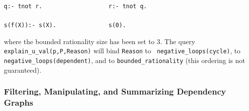 \begin{description}
\begin{example}
\begin{verbatim}
q:- tnot r.                   r:- tnot q.

s(f(X)):- s(X).               s(0).
\end{verbatim}
%
where the bounded rationality size has been set to 3.  The query {\tt
  explain\_u\_val(p,P,Reason)} will bind {\tt Reason} to {\tt
  negative\_loops(cycle)}, to {\tt negative\_loops(dependent)}, and
to {\tt bounded\_rationality} (this ordering is not guaranteed).
\end{example}
\end{description}

\subsubsection{Filtering, Manipulating, and Summarizing Dependency Graphs} \label{sec:dependency-graph-manipulation}


